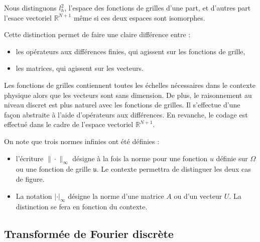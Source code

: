 Nous distinguons $l^2_h$, l'espace des fonctions de grilles d'une part, et d'autres part l'esace vectoriel $\mathbb{R}^{N+1}$ même si ces deux espaces sont isomorphes.

Cette distinction permet de faire une claire différence entre :
\begin{itemize}
\item les opérateurs aux différences finies, qui agissent sur les fonctions de grille,
\item les matrices, qui agissent sur les vecteurs.
\end{itemize}
Les fonctions de grilles contiennent toutes les échelles nécessaires dans le contexte physique alors que les vecteurs sont sans dimension. De plus, le raisonnement au niveau discret est plus naturel avec les fonctions de grilles. Il s'effectue d'une façon abstraite à l'aide d'opérateurs aux différences. En revanche, le codage est effectué dans le cadre de l'espace vectoriel $\mathbb{R}^{N+1}$.

On note que trois normes infinies ont été définies :
\begin{itemize}
\item l'écriture $\| \cdot \|_{\infty}$ désigne à la fois la norme pour une fonction $u$ définie sur $\Omega$ ou une fonction de grille $\mathfrak{u}$. Le contexte permettra de distinguer les deux cas de figure.
\item La notation $| \cdot |_{\infty}$ désigne la norme d'une matrice $A$ ou d'un vecteur $U$. La distinction se fera en fonction du contexte.
\end{itemize}




















\subsection{Transformée de Fourier discrète}

